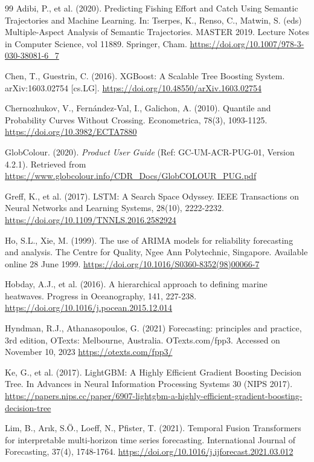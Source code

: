 \documentclass[twoside,11pt]{article}
\begin{document}
\newpage
\begin{thebibliography}{99}
Adibi, P., et al. (2020). Predicting Fishing Effort and Catch Using Semantic Trajectories and Machine Learning. In: Tserpes, K., Renso, C., Matwin, S. (eds) Multiple-Aspect Analysis of Semantic Trajectories. MASTER 2019. Lecture Notes in Computer Science, vol 11889. Springer, Cham. \url{https://doi.org/10.1007/978-3-030-38081-6_7}

Chen, T., Guestrin, C. (2016). XGBoost: A Scalable Tree Boosting System. arXiv:1603.02754 [cs.LG]. \url{https://doi.org/10.48550/arXiv.1603.02754}

Chernozhukov, V., Fernández-Val, I., Galichon, A. (2010). Quantile and Probability Curves Without Crossing. Econometrica, 78(3), 1093-1125. \url{https://doi.org/10.3982/ECTA7880}

GlobColour. (2020). \emph{Product User Guide} (Ref: GC-UM-ACR-PUG-01, Version 4.2.1). Retrieved from \url{https://www.globcolour.info/CDR_Docs/GlobCOLOUR_PUG.pdf}

Greff, K., et al. (2017). LSTM: A Search Space Odyssey. IEEE Transactions on Neural Networks and Learning Systems, 28(10), 2222-2232. \url{https://doi.org/10.1109/TNNLS.2016.2582924}

Ho, S.L., Xie, M. (1999). The use of ARIMA models for reliability forecasting and analysis. The Centre for Quality, Ngee Ann Polytechnic, Singapore. Available online 28 June 1999. \url{https://doi.org/10.1016/S0360-8352(98)00066-7}

Hobday, A.J., et al. (2016). A hierarchical approach to defining marine heatwaves. Progress in Oceanography, 141, 227-238. \url{https://doi.org/10.1016/j.pocean.2015.12.014}

Hyndman, R.J., Athanasopoulos, G. (2021) Forecasting: principles and practice, 3rd edition, OTexts: Melbourne, Australia. OTexts.com/fpp3. Accessed on November 10, 2023 \url{https://otexts.com/fpp3/}

Ke, G., et al. (2017). LightGBM: A Highly Efficient Gradient Boosting Decision Tree. In Advances in Neural Information Processing Systems 30 (NIPS 2017). \url{https://papers.nips.cc/paper/6907-lightgbm-a-highly-efficient-gradient-boosting-decision-tree}

Lim, B., Arık, S.Ö., Loeff, N., Pfister, T. (2021). Temporal Fusion Transformers for interpretable multi-horizon time series forecasting. International Journal of Forecasting, 37(4), 1748-1764. \url{https://doi.org/10.1016/j.ijforecast.2021.03.012}


\end{thebibliography}
\end{document}
